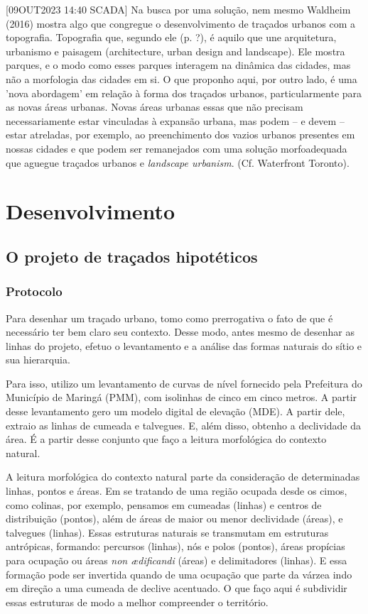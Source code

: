 \documentclass[12pt, a4paper]{book} %
\begin{document}
            

        [09OUT2023 14:40 SCADA] Na busca por uma solução, nem mesmo Waldheim (2016) mostra algo que congregue o desenvolvimento de traçados urbanos com a topografia. Topografia que, segundo ele (p. ?), é aquilo que une arquitetura, urbanismo e paisagem (architecture, urban design and landscape). Ele mostra parques, e o modo como esses parques interagem na dinâmica das cidades, mas não a morfologia das cidades em si.
        O que proponho aqui, por outro lado, é uma 'nova abordagem' em relação à forma dos traçados urbanos, particularmente para as novas áreas urbanas. Novas áreas urbanas essas que não precisam necessariamente estar vinculadas à expansão urbana, mas podem – e devem – estar atreladas, por exemplo, ao preenchimento dos vazios urbanos presentes em nossas cidades e que podem ser remanejados com uma solução morfoadequada que aguegue traçados urbanos e \textit{landscape urbanism}. (Cf. Waterfront Toronto).

    \part[Desenvolvimento]{Desenvolvimento}

        \chapter[Traçados hipotéticos]{O projeto de traçados hipotéticos}

            \section{Protocolo}

        Para desenhar um traçado urbano, tomo como prerrogativa o fato de que é necessário ter bem claro seu contexto. Desse modo, antes mesmo de desenhar as linhas do projeto, efetuo o levantamento e a análise das formas naturais do sítio e sua hierarquia. 

        Para isso, utilizo um levantamento de curvas de nível fornecido pela Prefeitura do Município de Maringá (PMM), com isolinhas de cinco em cinco metros. A partir desse levantamento gero um modelo digital de elevação (MDE). A partir dele, extraio as linhas de cumeada e talvegues. E, além disso, obtenho a declividade da área. É a partir desse conjunto que faço a leitura morfológica do contexto natural.

        A leitura morfológica do contexto natural parte da consideração de determinadas linhas, pontos e áreas. Em se tratando de uma região ocupada desde os cimos, como colinas, por exemplo, pensamos em cumeadas (linhas) e centros de distribuição (pontos), além de áreas de maior ou menor declividade (áreas), e talvegues (linhas). Essas estruturas naturais se transmutam em estruturas antrópicas, formando: percursos (linhas), nós e polos (pontos), áreas propícias para ocupação ou áreas \textit{non ædificandi} (áreas) e delimitadores (linhas). E essa formação pode ser invertida quando de uma ocupação que parte da várzea indo em direção a uma cumeada de declive acentuado. O que faço aqui é subdividir essas estruturas de modo a melhor compreender o território. 
        
\end{document}
